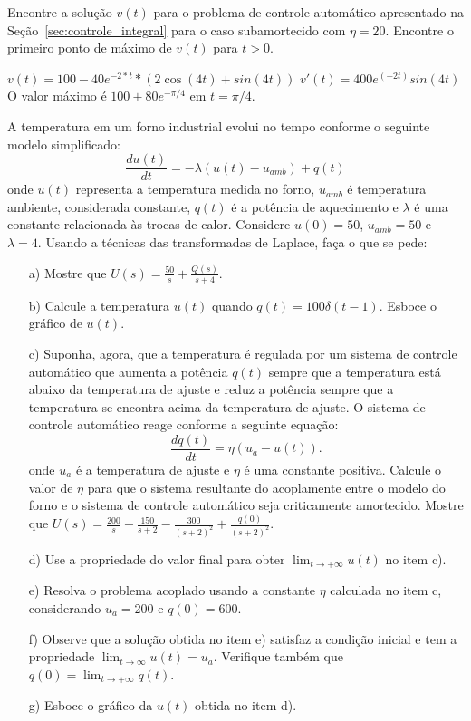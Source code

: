 \begin{exer}
       Encontre a solução $v(t)$ para o problema de controle automático apresentado na Seção~\ref{sec:controle_integral} para o caso subamortecido com $\eta=20$. Encontre o primeiro ponto de máximo de $v(t)$ para $t>0$.
\end{exer}
\begin{resp}
       $v(t) = 100 - 40e^{-2*t}*\left(2\cos(4t) + sin(4t)\right)$
       $v'(t) = 400 e^(-2 t) sin(4 t)$
       O valor máximo é  $100 + 80e^{-\pi/4} $ em $t=\pi/4$.
\end{resp}

\begin{exer}A temperatura em um forno industrial evolui no tempo conforme o seguinte modelo simplificado:
\begin{equation}\frac{d u(t)}{dt}=-\lambda (u(t)-u_{amb}) + q(t)\end{equation}
onde $u(t)$ representa a temperatura medida no forno, $u_{amb}$ é temperatura ambiente, considerada constante, $q(t)$ é a potência de aquecimento e $\lambda$ é uma constante relacionada às trocas de calor. Considere $u(0)=50$, $u_{amb}=50$ e $\lambda=4$. Usando a técnicas das transformadas de Laplace, faça o que se pede:
\begin{itemize}
 \item [a)] Mostre que $U(s)=\frac{50}{s}+\frac{Q(s)}{s+4}$.
 \item [b)] Calcule a temperatura $u(t)$ quando  $q(t)=100 \delta(t-1)$. Esboce o gráfico de $u(t)$.
 \item [c)] Suponha, agora, que a temperatura é regulada por um sistema de controle automático que aumenta a potência $q(t)$ sempre que a temperatura está abaixo da temperatura de ajuste e reduz a potência sempre que a temperatura se encontra acima da temperatura de ajuste. O sistema de controle automático reage conforme a seguinte equação:
 \begin{equation}\frac{dq(t)}{dt} = \eta (u_a-u(t)).\end{equation}
 onde $u_a$ é a temperatura de ajuste e $\eta$ é uma constante positiva. Calcule o valor de $\eta$ para que o sistema resultante do acoplamente entre o modelo do forno e o sistema de controle automático seja criticamente amortecido. Mostre que $U(s)=\frac{200}{s}-\frac{150}{s+2}-\frac{300}{(s+2)^2}+\frac{q(0)}{(s+2)^2}$.
 \item[d)] Use a propriedade do valor final para obter $\displaystyle\lim_{t\to+\infty} u(t)$ no item c).
 \item[e)] Resolva o problema acoplado usando a constante $\eta$ calculada no item c, considerando $u_a=200$ e $q(0)=600$.
  \item[f)] Observe que a solução obtida no item e) satisfaz a condição inicial e tem a propriedade $\displaystyle\lim_{t\to \infty}u(t)=u_a$. Verifique também que $q(0)=\lim_{t\to+\infty} q(t)$.
 \item [g)] Esboce o gráfico da $u(t)$ obtida no item d).
 \end{itemize}
\end{exer}
